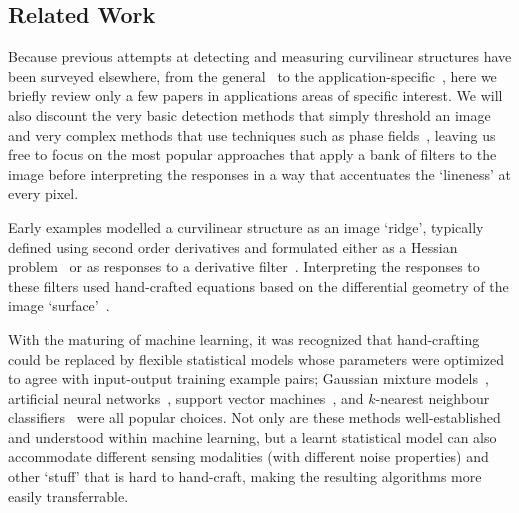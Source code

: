\subsection{Related Work}

Because previous attempts at detecting and measuring curvilinear structures have been surveyed elsewhere, from the general~\cite{Papari_Petkov_IVC11} to the application-specific~\cite{Kirbas_Quek_ACMCS04,Lesage_etal_MIA09}, here we briefly review only a few papers in applications areas of specific interest. We will also discount the very basic detection methods that simply threshold an image~\cite{Jiang_Mojon_TPAMI03} and very complex methods that use techniques such as phase fields~\cite{Peng_etal_IJCV09}, leaving us free to focus on the most popular approaches that apply a bank of filters to the image before interpreting the responses in a way that accentuates the `lineness' at every pixel.

Early examples modelled a curvilinear structure as an image `ridge', typically defined using second order derivatives and formulated either as a Hessian problem~\cite{Frangi_etal_MICCAI98,Sato_etal_MIA98} or as responses to a derivative filter~\cite{Staal_etal_TMI04,Aylward_Bullitt_TMI02,Steger_TPAMI98,Koenderink_vanDoorn_TPAMI92}. Interpreting the responses to these filters used hand-crafted equations based on the differential geometry of the image `surface'~\cite{Frangi_etal_MICCAI98,Sato_etal_MIA98}.

With the maturing of machine learning, it was recognized that hand-crafting could be replaced by flexible statistical models whose parameters were optimized to agree with input-output training example pairs; Gaussian mixture models~\cite{Soares_etal_TMI06}, %
artificial neural networks~\cite{Marin_etal_TMI11,Minh_Hinton_ECCV10}, %
support vector machines~\cite{Ricci_Perfetti_TMI07,Gonzalez_etal_CVPR09}, and %
$k$-nearest neighbour classifiers~\cite{Staal_etal_TMI04} were all popular choices. Not only are these methods well-established and understood within machine learning, but a learnt statistical model can also accommodate different sensing modalities (with different noise properties) and other `stuff' that is hard to hand-craft, making the resulting algorithms more easily transferrable.


